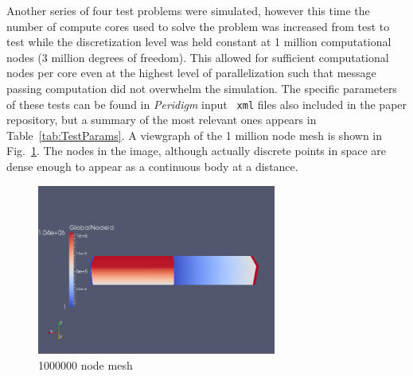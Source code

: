 \documentclass[preprint,12pt]{elsarticle}
\begin{document}
Another series of four test problems were simulated, however this time the
number of compute cores used to solve the problem was increased from test to
test while the discretization level was held constant at 1 million
computational nodes (3 million degrees of freedom). This allowed for sufficient
computational nodes per core even at the highest level of parallelization such
that message passing computation did not overwhelm the simulation.  The
specific parameters of these tests can be found in \emph{Peridigm} input {\tt
xml} files also included in the paper repository, but a summary of the most relevant
ones appears in Table~\ref{tab:TestParams}. A viewgraph of the 1 million node mesh is
shown in Fig.~\ref{fig:MCMesh}. The nodes in the image, although actually discrete points
in space are dense enough to appear as a continuous body at a distance.

\begin{figure}[tbp] \centering \includegraphics[width=0.7\textwidth]{./figs/mesh1000000.png}
\caption{1000000 node mesh} \label{fig:MCMesh}
\end{figure}
\end{document}

